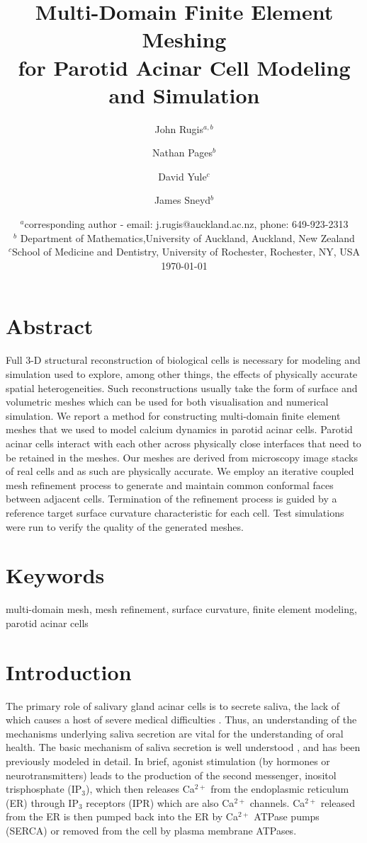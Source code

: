 \documentclass[a4paper,10pt]{article}
\title{Multi-Domain Finite Element Meshing\\for Parotid Acinar Cell Modeling and Simulation}
\author{John Rugis$^{a,b}$ \and Nathan Pages$^b$ \and David Yule$^c$ \and James Sneyd$^b$}
\date{%
  $^a$corresponding author - email: j.rugis@auckland.ac.nz, phone: 649-923-2313\\%
  $^b$ Department of Mathematics,University of Auckland, Auckland, New Zealand\\%
  $^c$School of Medicine and Dentistry, University of Rochester, Rochester, NY, USA\\[2ex]%
  \today
}
\begin{document}
\maketitle

\section*{Abstract}
Full 3-D structural reconstruction of biological cells is necessary for modeling and simulation used to explore,
among other things, the effects of physically accurate spatial heterogeneities. Such reconstructions usually
take the form of surface and volumetric meshes which can be used for both visualisation and numerical
simulation. We report a method for constructing multi-domain finite element meshes that we used to model
calcium dynamics in parotid acinar cells. Parotid acinar cells interact with each other across physically close
interfaces that need to be retained in the meshes. Our meshes are derived from microscopy image stacks of
real cells and as such are physically accurate. We employ an iterative coupled mesh refinement process to
generate and maintain common conformal faces between adjacent cells. Termination of the refinement
process is guided by a reference target surface curvature characteristic for each cell. Test simulations were
run to verify the quality of the generated meshes.\\

\section*{Keywords}
multi-domain mesh, mesh refinement, surface curvature, finite element modeling, parotid acinar cells\\

\section{Introduction}
The primary role of salivary gland acinar cells is to secrete saliva, the lack of which causes a host of severe medical difficulties \cite{fox1985,melvin1991}. Thus, an understanding of the mechanisms underlying saliva secretion are vital for the understanding of oral health.  The basic mechanism of saliva secretion is well understood \cite{nauntofte1992}, and has been previously modeled in detail.
In brief, agonist stimulation (by hormones or neurotransmitters) leads to the production of the second messenger, inositol trisphosphate (IP$_3$), which then releases Ca$^{2+}$ from the endoplasmic reticulum (ER) through IP$_3$ receptors (IPR) which are also Ca$^{2+}$ channels. Ca$^{2+}$ released from the ER is then pumped back into the ER by Ca$^{2+}$ ATPase pumps (SERCA) or removed from the cell by plasma membrane ATPases.\\
\end{document}
